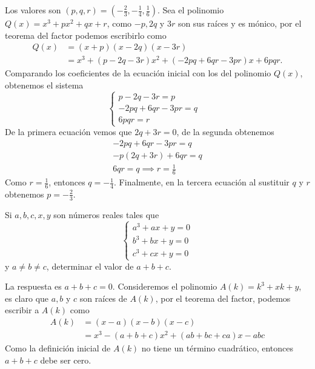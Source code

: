 \begin{solution}
    Los valores son $(p,q,r) = \left(-\frac{2}{3}, -\frac{1}{4}, \frac{1}{6}\right)$.
    Sea el polinomio $Q(x) = x^3 + px^2 + qx + r$, como $-p, 2q$ y $3r$ son sus raíces y es mónico, por el teorema del factor podemos escribirlo como
    \begin{align*}
        Q(x) &= (x + p)(x - 2q)(x - 3r)\\
        &= x^3 + (p - 2q - 3r)x^2 + (-2pq + 6qr - 3pr)x + 6pqr.
    \end{align*}
    Comparando los coeficientes de la ecuación inicial con los del polinomio $Q(x)$, obtenemos el sistema
    \[
        \begin{cases}
            p - 2q - 3r = p & \\
            -2pq + 6qr - 3pr = q & \\
            6pqr = r &
        \end{cases}
    \]
    De la primera ecuación vemos que $2q + 3r = 0$, de la segunda obtenemos
    \begin{align*}
        -2pq + 6qr - 3pr = q\\
        -p(2q + 3r) + 6qr = q \\
        6qr = q \implies r = \frac{1}{6}
    \end{align*}
    Como $r = \frac{1}{6}$, entonces $q = -\frac{1}{4}$.
    Finalmente, en la tercera ecuación al sustituir $q$ y $r$ obtenemos $p = -\frac{2}{3}$.
\end{solution}

\begin{exercise}
    Si $a,b,c,x,y$ son números reales tales que
    \[
        \begin{cases}
            a^3 + ax + y = 0\\
            b^3 + bx + y = 0\\
            c^3 + cx + y = 0
        \end{cases}
    \]
    y $a \neq b \neq c$, determinar el valor de $a + b + c$.
\end{exercise}

\begin{solution}
    La respuesta es $a + b +  c = 0$.
    Consideremos el polinomio $A(k) = k^3 + xk + y$, es claro que $a,b$ y $c$ son raíces de $A(k)$, por el teorema del factor,
    podemos escribir a $A(k)$ como
    \begin{align*}
        A(k) &= (x - a)(x - b)(x - c)\\
        &= x^3 - (a + b + c)x^2 + (ab + bc + ca)x - abc
    \end{align*}
    Como la definición inicial de $A(k)$ no tiene un término cuadrático, entonces $a + b + c$ debe ser cero.
\end{solution}

